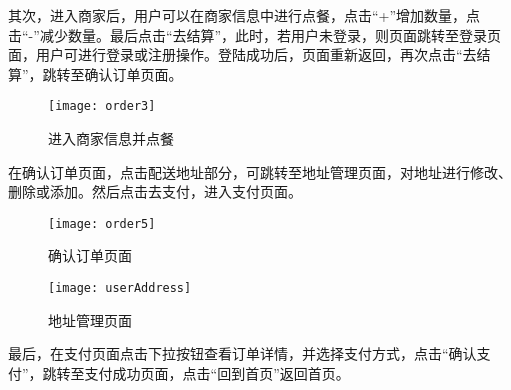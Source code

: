 其次，进入商家后，用户可以在商家信息中进行点餐，点击“+”增加数量，点击“-”减少数量。最后点击“去结算”，此时，若用户未登录，则页面跳转至登录页面，用户可进行登录或注册操作。登陆成功后，页面重新返回，再次点击“去结算”，跳转至确认订单页面。
\begin{figure}[htbp]
    \centering
    \texttt{[image: order3]}
    \caption{进入商家信息并点餐}\label{fig:order3}
\end{figure}

在确认订单页面，点击配送地址部分，可跳转至地址管理页面，对地址进行修改、删除或添加。然后点击去支付，进入支付页面。
\begin{figure}[htbp]
    \centering
    \begin{minipage}{0.4\textwidth}
        \centering
        \texttt{[image: order5]}
        \caption{确认订单页面}\label{fig:order5}
    \end{minipage}
    \begin{minipage}{0.4\textwidth}
        \centering
        \texttt{[image: userAddress]}
        \caption{地址管理页面}\label{fig:userAddress}
    \end{minipage}
    \vspace{\baselineskip}
\end{figure}

最后，在支付页面点击下拉按钮查看订单详情，并选择支付方式，点击“确认支付”，跳转至支付成功页面，点击“回到首页”返回首页。~\\

